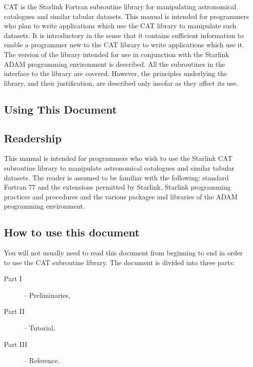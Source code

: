 CAT is the Starlink Fortran subroutine library for manipulating
astronomical catalogues and similar tabular datasets. This manual is
intended for programmers who plan to write applications which use the
CAT library to manipulate such datasets. It is introductory in the
sense that it contains sufficient information to enable a programmer new
to the CAT library to write applications which use it. The version of
the library intended for use in conjunction with the Starlink ADAM
programming environment is described. All the subroutines in the
interface to the library are covered. However, the principles underlying
the library, and their justification, are described only insofar as they
affect its use.

\pagebreak
\markboth{\stardocname}{\stardocname}

\begin{htmlonly}
\section*{Using This Document}
\end{htmlonly}

\subsection*{Readership}

This manual is intended for programmers who wish to use the Starlink
CAT subroutine library to manipulate astronomical catalogues and
similar tabular datasets. The reader is assumed to be familiar with the
following: standard Fortran 77 and the extensions permitted by Starlink,
Starlink programming practices and procedures and the various packages
and libraries of the ADAM programming environment.


\subsection*{How to use this document}

You will not usually need to read this document from beginning to end in
order to use the CAT subroutine library. The document is divided into
three parts:

\begin{description}

   \item[{\rm Part I}] -- Preliminaries,

  \item[{\rm Part II}] -- Tutorial,

  \item[{\rm Part III}] -- Reference.

\end{description}

